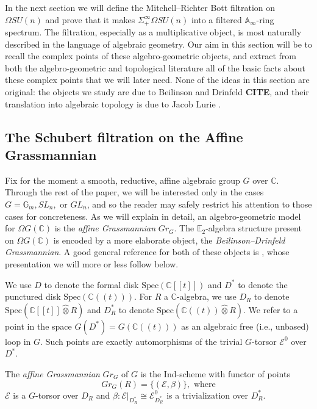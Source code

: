 
In the next section we will define the Mitchell--Richter Bott filtration on $\Omega SU(n)$ and prove that it makes $\Sigma^{\infty}_+ \Omega SU(n)$ into a filtered $\mathbb{A}_\infty$-ring spectrum.  The filtration, especially as a multiplicative object, is most naturally described in the language of algebraic geometry.  Our aim in this section will be to recall the complex points of these algebro-geometric objects, and extract from both the algebro-geometric and topological literature all of the basic facts about these complex points that we will later need.  None of the ideas in this section are original: the objects we study are due to Beilinson and Drinfeld \textbf{CITE}, and their translation into algebraic topology is due to Jacob Lurie  \cite[\S 5.5]{HA}.

\subsection{The Schubert filtration on the Affine Grassmannian}

Fix for the moment a smooth, reductive, affine algebraic group $G$ over $\mathbb{C}$.  Through the rest of the paper, we will be interested only in the cases $G=\mathbb{G}_m,SL_n,$ or $GL_n$, and so the reader may safely restrict his attention to those cases for concreteness.  As we will explain in detail, an algebro-geometric model for $\Omega G(\mathbb{C})$ is the \textit{affine Grassmannian} $Gr_G$.  The $\mathbb{E}_2$-algebra structure present on $\Omega G(\mathbb{C})$ is encoded by a more elaborate object, the \textit{Beilinson--Drinfeld Grassmannian}.  A good general reference for both of these objects is \cite{Zhu}, whose presentation we will more or less follow below.

We use $D$ to denote the formal disk $\text{Spec}(\mathbb{C}[[t]])$ and $D^*$ to denote the punctured disk $\text{Spec}(\mathbb{C}((t)))$.  For $R$ a $\mathbb{C}$-algebra, we use $D_R$ to denote $\text{Spec}(\mathbb{C}[[t]] \hat{\otimes} R)$ and $D^*_R$ to denote $\text{Spec}(\mathbb{C}((t)) \hat{\otimes} R)$.  We refer to a point in the space $G(D^*)=G(\mathbb{C}((t)))$ as an algebraic free (i.e., unbased) loop in $G$.  Such points are exactly automorphisms of the trivial $G$-torsor $\mathcal{E}^0$ over $D^*$.

\begin{dfn}
The \textit{affine Grassmannian} $Gr_G$ of $G$ is the Ind-scheme with functor of points
$$Gr_G(R) = \{(\mathcal{E},\beta)\},\text{ where}$$
$\mathcal{E}$ is a $G$-torsor over $D_{R}$ and $\beta:\mathcal{E}|_{D^*_{R}} \cong \mathcal{E}^0_{D^*_{R}}$ is a trivialization over $D^*_{R}$.
\end{dfn}

